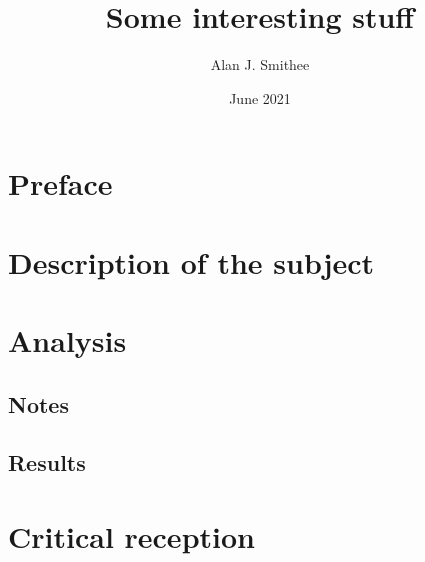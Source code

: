\documentclass[10pt,a4paper,notitlepage,oneside,twocolumn,toc=sectionentrywithdots]{scrartcl}
\begin{document}
\title{Some interesting stuff}
\author{Alan J. Smithee}
\date{June 2021}
\maketitle

\tableofcontents

% 
% 
% 
% 
% 

\section{Preface}
\lipsum[1-2]

\section{Description of the subject}
\lipsum[3-8]

\section{Analysis}
\subsection{Notes}
\lipsum[9-10]

\subsection{Results}
\lipsum[11-12]

\section{Critical reception}
\lipsum[13-16]
\end{document}
